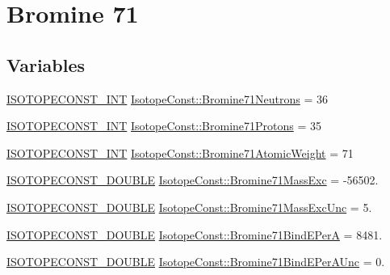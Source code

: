 \hypertarget{group___isotope_const-_bromine-_br71}{}\section{Bromine 71}
\label{group___isotope_const-_bromine-_br71}
\subsection*{Variables}
\begin{DoxyCompactItemize}
\item 
\mbox{\hyperlink{group___isotope_const-_macros_ga5f18360b3e99483a35c32d789e62621c}{I\+S\+O\+T\+O\+P\+E\+C\+O\+N\+S\+T\+\_\+\+I\+NT}} \mbox{\hyperlink{group___isotope_const-_bromine-_br71_ga7fe19bbff94c9df0dd7166c6f50f1364}{Isotope\+Const\+::\+Bromine71\+Neutrons}} = 36
\item 
\mbox{\hyperlink{group___isotope_const-_macros_ga5f18360b3e99483a35c32d789e62621c}{I\+S\+O\+T\+O\+P\+E\+C\+O\+N\+S\+T\+\_\+\+I\+NT}} \mbox{\hyperlink{group___isotope_const-_bromine-_br71_gaf3ae19f7e308580e7779bdbdceb994cc}{Isotope\+Const\+::\+Bromine71\+Protons}} = 35
\item 
\mbox{\hyperlink{group___isotope_const-_macros_ga5f18360b3e99483a35c32d789e62621c}{I\+S\+O\+T\+O\+P\+E\+C\+O\+N\+S\+T\+\_\+\+I\+NT}} \mbox{\hyperlink{group___isotope_const-_bromine-_br71_ga82413e5c6e508a8e3e4a0198a7b35f13}{Isotope\+Const\+::\+Bromine71\+Atomic\+Weight}} = 71
\item 
\mbox{\hyperlink{group___isotope_const-_macros_ga8f45a7272ce02c0b4c65c44636ed719a}{I\+S\+O\+T\+O\+P\+E\+C\+O\+N\+S\+T\+\_\+\+D\+O\+U\+B\+LE}} \mbox{\hyperlink{group___isotope_const-_bromine-_br71_gac96237d7efaa1749de4bdc1b5ffb9a9c}{Isotope\+Const\+::\+Bromine71\+Mass\+Exc}} = -\/56502.
\item 
\mbox{\hyperlink{group___isotope_const-_macros_ga8f45a7272ce02c0b4c65c44636ed719a}{I\+S\+O\+T\+O\+P\+E\+C\+O\+N\+S\+T\+\_\+\+D\+O\+U\+B\+LE}} \mbox{\hyperlink{group___isotope_const-_bromine-_br71_ga8b12d6bac961bb6f83311fec327fb997}{Isotope\+Const\+::\+Bromine71\+Mass\+Exc\+Unc}} = 5.
\item 
\mbox{\hyperlink{group___isotope_const-_macros_ga8f45a7272ce02c0b4c65c44636ed719a}{I\+S\+O\+T\+O\+P\+E\+C\+O\+N\+S\+T\+\_\+\+D\+O\+U\+B\+LE}} \mbox{\hyperlink{group___isotope_const-_bromine-_br71_gac811f1bf8d1737ad416ccb243ed428ba}{Isotope\+Const\+::\+Bromine71\+Bind\+E\+PerA}} = 8481.
\item 
\mbox{\hyperlink{group___isotope_const-_macros_ga8f45a7272ce02c0b4c65c44636ed719a}{I\+S\+O\+T\+O\+P\+E\+C\+O\+N\+S\+T\+\_\+\+D\+O\+U\+B\+LE}} \mbox{\hyperlink{group___isotope_const-_bromine-_br71_ga1fce545bc210d9f896e9679179cfa4a9}{Isotope\+Const\+::\+Bromine71\+Bind\+E\+Per\+A\+Unc}} = 0.

\end{DoxyCompactItemize}
